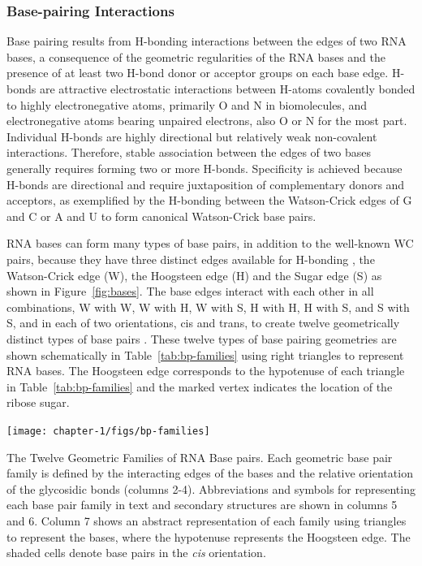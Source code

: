 \subsubsection{Base-pairing Interactions}

Base pairing results from H-bonding interactions between the edges of two RNA
bases, a consequence of the geometric regularities of the RNA bases and the
presence of at least two H-bond donor or acceptor groups on each base edge.
H-bonds are attractive electrostatic interactions between H-atoms covalently
bonded to highly electronegative atoms, primarily O and N in biomolecules, and
electronegative atoms bearing unpaired electrons, also O or N for the most part.
Individual H-bonds are highly directional but relatively weak non-covalent
interactions. Therefore, stable association between the edges of two bases
generally requires forming two or more H-bonds. Specificity is achieved because
H-bonds are directional and require juxtaposition of complementary donors and
acceptors, as exemplified by the H-bonding between the Watson-Crick edges of G
and C or A and U to form canonical Watson-Crick base pairs. 

RNA bases can form many types of base pairs, in addition to the well-known WC
pairs, because they have three distinct edges available for H-bonding
\cite{Leontis2001, Leontis2002f}, the Watson-Crick edge (W), the Hoogsteen edge
(H) and the Sugar edge (S) as shown in Figure~\ref{fig:bases}. The base edges
interact with each other in all combinations, W with W, W with H, W with S, H
with H, H with S, and S with S, and in each of two orientations, cis and trans,
to create twelve geometrically distinct types of base pairs \cite{Leontis2001}.
These twelve types of base pairing geometries are shown schematically in Table~\ref{tab:bp-families}
using right triangles to represent RNA bases. The Hoogsteen edge corresponds to
the hypotenuse of each triangle in Table~\ref{tab:bp-families} and the marked vertex indicates the
location of the ribose sugar. 

\begin{table}
  \texttt{[image: chapter-1/figs/bp-families]}
  \caption{The Twelve Geometric Families of RNA Base pairs. Each geometric
    base pair family is defined by the interacting edges of the bases and the
    relative orientation of the glycosidic bonds (columns 2-4). Abbreviations
    and symbols for representing each base pair family in text and secondary
    structures are shown in columns 5 and 6. Column 7 shows an abstract
    representation of each family using triangles to represent the bases,
    where the hypotenuse represents the Hoogsteen edge. The shaded cells
  denote base pairs in the \emph{cis} orientation. }
  \label{tab:bp-families}
\end{table}

